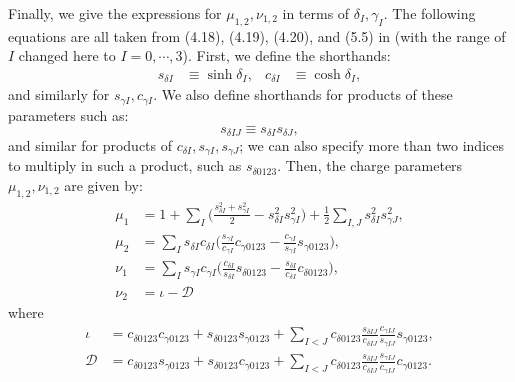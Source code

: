 \documentclass[12pt,a4paper]{article}
\newcommand{\be}{\begin{equation}}
\newcommand{\ee}{\end{equation}}
\begin{document}
Finally, we give the expressions for $\mu_{1,2},\nu_{1,2}$ in terms of $\delta_I,\gamma_I$. The following equations are all taken from (4.18), (4.19), (4.20), and (5.5) in \cite{Chow:2014cca} (with the range of $I$ changed here to $I=0,\cdots, 3$).
%
First, we define the shorthands:
\begin{align}
 s_{\delta I} &\equiv \sinh \delta_I, & c_{\delta I} &\equiv \cosh \delta_I,
 \end{align}
 and similarly for $s_{\gamma I},c_{\gamma I}$. We also define shorthands for products of these parameters such as:
 \be s_{\delta IJ} \equiv s_{\delta I} s_{\delta J},\ee
 and similar for products of $c_{\delta I},s_{\gamma I},s_{\gamma J}$; we can also specify more than two indices to multiply in such a product, such as $s_{\delta 0123}$.
 Then, the charge parameters $\mu_{1,2},\nu_{1,2}$ are given by:
\begin{align}
\mu_1 & = 1 + \sum_I \bigg( \frac{s_{\delta I}^2 + s_{\gamma I}^2}{2} - s_{\delta I}^2 s_{\gamma I}^2 \bigg) + \frac{1}{2} \sum_{I, J} s_{\delta I}^2 s_{\gamma J}^2 ,\\
\mu_2 & = \sum_I s_{\delta I} c_{\delta I} \bigg( \frac{s_{\gamma I}}{c_{\gamma I}} c_{\gamma 0 1 2 3} - \frac{c_{\gamma I}}{s_{\gamma I}} s_{\gamma 0 1 2 3}\bigg) ,\\
\nu_1 & = \sum_I s_{\gamma I} c_{\gamma I} \bigg( \frac{c_{\delta I}}{s_{\delta I}} s_{\delta 0 1 2 3} - \frac{s_{\delta I}}{c_{\delta I}} c_{\delta 0 1 2 3} \bigg) ,\\
\nu_2 &= \iota - \mathcal{D}
\end{align}
where
\begin{align}
\iota &= c_{\delta 0 1 2 3}c_{\gamma 0 1 2 3}+s_{\delta 0 1 2 3} s_{\gamma 0 1 2 3}+ \sum_{I < J} c_{\delta 0 1 2 3} \frac{s_{\delta I J}}{c_{\delta I J}} \frac{c_{\gamma I J}}{s_{\gamma I J}} s_{\gamma 0 1 2 3} , \\
\mathcal{D} &= c_{\delta 0 1 2 3}s_{\gamma 0 1 2 3}+s_{\delta 0 1 2 3}c_{\gamma 0 1 2 3} + \sum_{I < J} c_{\delta 0 1 2 3} \frac{s_{\delta I J}}{c_{\delta I J}} \frac{s_{\gamma I J}}{c_{\gamma I J}} c_{\gamma 0 1 2 3}.
\end{align}
\end{document}
